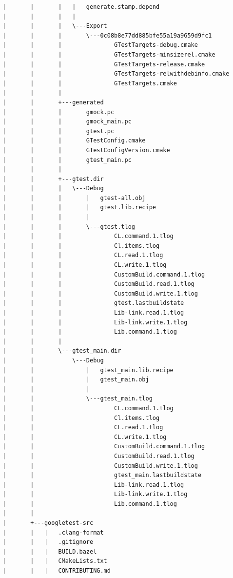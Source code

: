 \documentclass[a4paper,12pt]{article}
\begin{document}
\begin{verbatim}
|       |       |   |   generate.stamp.depend
|       |       |   |   
|       |       |   \---Export
|       |       |       \---0c08b8e77dd885bfe55a19a9659d9fc1
|       |       |               GTestTargets-debug.cmake
|       |       |               GTestTargets-minsizerel.cmake
|       |       |               GTestTargets-release.cmake
|       |       |               GTestTargets-relwithdebinfo.cmake
|       |       |               GTestTargets.cmake
|       |       |               
|       |       +---generated
|       |       |       gmock.pc
|       |       |       gmock_main.pc
|       |       |       gtest.pc
|       |       |       GTestConfig.cmake
|       |       |       GTestConfigVersion.cmake
|       |       |       gtest_main.pc
|       |       |       
|       |       +---gtest.dir
|       |       |   \---Debug
|       |       |       |   gtest-all.obj
|       |       |       |   gtest.lib.recipe
|       |       |       |   
|       |       |       \---gtest.tlog
|       |       |               CL.command.1.tlog
|       |       |               Cl.items.tlog
|       |       |               CL.read.1.tlog
|       |       |               CL.write.1.tlog
|       |       |               CustomBuild.command.1.tlog
|       |       |               CustomBuild.read.1.tlog
|       |       |               CustomBuild.write.1.tlog
|       |       |               gtest.lastbuildstate
|       |       |               Lib-link.read.1.tlog
|       |       |               Lib-link.write.1.tlog
|       |       |               Lib.command.1.tlog
|       |       |               
|       |       \---gtest_main.dir
|       |           \---Debug
|       |               |   gtest_main.lib.recipe
|       |               |   gtest_main.obj
|       |               |   
|       |               \---gtest_main.tlog
|       |                       CL.command.1.tlog
|       |                       Cl.items.tlog
|       |                       CL.read.1.tlog
|       |                       CL.write.1.tlog
|       |                       CustomBuild.command.1.tlog
|       |                       CustomBuild.read.1.tlog
|       |                       CustomBuild.write.1.tlog
|       |                       gtest_main.lastbuildstate
|       |                       Lib-link.read.1.tlog
|       |                       Lib-link.write.1.tlog
|       |                       Lib.command.1.tlog
|       |                       
|       +---googletest-src
|       |   |   .clang-format
|       |   |   .gitignore
|       |   |   BUILD.bazel
|       |   |   CMakeLists.txt
|       |   |   CONTRIBUTING.md

\end{verbatim}
\end{document}
